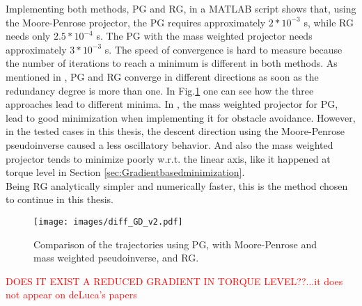 Implementing both methods, PG and RG, in a MATLAB script shows that, using the Moore-Penrose projector, the PG  requires approximately $2*10^{-3}$ s, while RG  needs only $2.5*10^{-4}$ s. The PG with the mass weighted projector needs approximately $3*10^{-3}$ s. The speed of convergence is hard to measure because the number of iterations to reach a minimum is different in both methods.
As mentioned in \cite{reduced_gradient}, PG and RG converge in different directions as soon as the redundancy degree is more than one. In Fig.\ref{fig:diff_GD_v2} one can see how the three approaches lead to different minima.  In \cite{Nemec_2}, the mass weighted projector for PG, lead to good minimization when implementing it for obstacle avoidance. However, in the tested cases in this thesis, the descent direction using the Moore-Penrose pseudoinverse caused a less oscillatory behavior. And also the mass weighted projector tends to minimize poorly w.r.t. the linear axis, like it happened at torque level in Section \ref{sec:Gradientbasedminimization}. \\ 
Being RG analytically simpler and numerically faster, this is the method chosen to continue in this thesis. 


\begin{figure}[!htb]
	\centerline{
		\texttt{[image: images/diff\_GD\_v2.pdf]}}
	\caption{Comparison of the trajectories using PG, with Moore-Penrose and mass weighted pseudoinverse, and RG.}
	\label{fig:diff_GD_v2}
\end{figure}




\textcolor{red}{DOES IT EXIST A REDUCED GRADIENT IN TORQUE LEVEL??...it does not appear on deLuca's papers}






%





